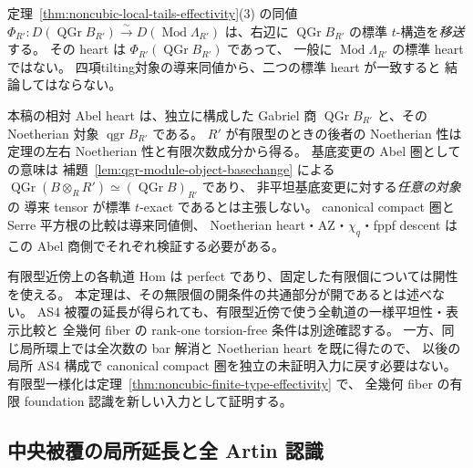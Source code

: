 \begin{remark}
\label{rem:noncubic-relative-heart-transport}
定理~\ref{thm:noncubic-local-tails-effectivity}(3) の同値
$\Phi_{R'}:D(\operatorname{QGr}B_{R'})
 \xrightarrow{\sim}D(\operatorname{Mod}\Lambda_{R'})$
は、右辺に $\operatorname{QGr}B_{R'}$ の標準
$t$-構造を\emph{移送}する。
その heart は $\Phi_{R'}(\operatorname{QGr}B_{R'})$ であって、
一般に $\operatorname{Mod}\Lambda_{R'}$ の標準 heart ではない。
四項tilting対象の導来同値から、二つの標準 heart が一致すると
結論してはならない。

本稿の相対 Abel heart は、独立に構成した
Gabriel 商 $\operatorname{QGr}B_{R'}$ と、その Noetherian
対象 $\operatorname{qgr}B_{R'}$ である。
$R'$ が有限型のときの後者の Noetherian 性は
定理の左右 Noetherian 性と有限次数成分から得る。
基底変更の Abel 圏としての意味は
補題~\ref{lem:qgr-module-object-basechange} による
$\operatorname{QGr}(B\otimes_RR')
 \simeq(\operatorname{QGr}B)_{R'}$ であり、
非平坦基底変更に対する\emph{任意の対象}の
導来 tensor が標準 $t$-exact であるとは主張しない。
canonical compact 圏と Serre 平方根の比較は導来同値側、
Noetherian heart・AZ・$\chi_q$・fppf descent は
この Abel 商側でそれぞれ検証する必要がある。
\end{remark}

\begin{remark}[局所定理と有限型一様化の役割]
有限型近傍上の各軌道 Hom は perfect であり、固定した有限個については開性を使える。
本定理は、その無限個の開条件の共通部分が開であるとは述べない。
AS4 被覆の延長が得られても、有限型近傍で使う全軌道の一様平坦性・表示比較と
全幾何 fiber の rank-one torsion-free 条件は別途確認する。
一方、同じ局所環上では全次数の bar 解消と Noetherian heart を既に得たので、
以後の局所 AS4 構成で canonical compact 圏を独立の未証明入力に戻す必要はない。
有限型一様化は定理~\ref{thm:noncubic-finite-type-effectivity} で、
全幾何 fiber の有限 foundation 認識を新しい入力として証明する。
\end{remark}


\subsection{中央被覆の局所延長と全 Artin 認識}

